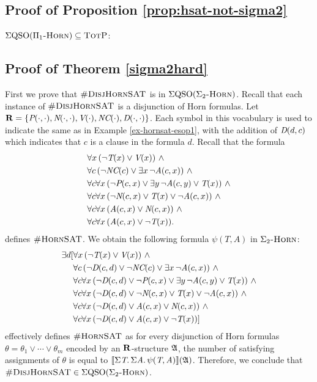 \subsection*{Proof of Proposition \ref{prop:hsat-not-sigma2}} %
$\Sigma{\rm QSO}(\Pi_1\textsc{-Horn}) \subseteq \text{\sc TotP}$:\vspace{1em}

\subsection*{Proof of Theorem \ref{sigma2hard}} %

First we prove that $\textsc{\#DisjHornSAT}$ is in $\Sigma{\rm QSO}(\Sigma_2\textsc{-Horn})$. Recall that each instance of $\textsc{\#DisjHornSAT}$ is a disjunction of Horn formulas. Let $\mathbf{R} = \{\textit{P}(\cdot,\cdot), \textit{N}(\cdot,\cdot), \textit{V}(\cdot), \textit{NC}(\cdot), \textit{D}(\cdot,\cdot)\}$. Each symbol in this vocabulary is used to indicate the same as in Example \ref{ex-hornsat-esop1}, with the addition of $\textit{D}(d,c)$ which indicates that $c$ is a clause in the formula $d$. Recall that the formula
\begin{align*}
&\forall x \, (\neg \pT(x) \vee \pV(x)) \ \wedge\\
&\forall c \, (\neg \textit{NC}(c) \vee \exists x \, \neg \textit{A}(c,x)) \ \wedge\\
&\forall c \forall x \, (\neg \textit{P}(c,x) \vee \exists y \, \neg \textit{A}(c,y) \vee \textit{T}(x)) \ \wedge\\
&\forall c \forall x \, (\neg \textit{N}(c,x) \vee \textit{T}(x) \vee \neg \textit{A}(c,x)) \ \wedge\\
&\forall c \forall x \, (\textit{A}(c,x) \vee \textit{N}(c,x)) \ \wedge\\
&\forall c \forall x \, (\textit{A}(c,x) \vee \neg\textit{T}(x)).
\end{align*}
defines $\textsc{\#HornSAT}$. We obtain the following formula $\psi(T,A)$ in $\Sigma_2\textsc{-Horn}$:
\begin{align*}
\exists d[&\forall x \, (\neg \textit{T}(x) \vee \textit{V}(x)) \ \wedge\\
&\forall c \, (\neg \textit{D}(c,d)\vee \neg \textit{NC}(c) \vee \exists x \, \neg \textit{A}(c,x)) \ \wedge\\
&\forall c \forall x \, (\neg \textit{D}(c,d)\vee\neg \textit{P}(c,x) \vee \exists y \, \neg \textit{A}(c,y) \vee \textit{T}(x)) \ \wedge\\
&\forall c \forall x \, (\neg \textit{D}(c,d)\vee\neg \textit{N}(c,x) \vee \textit{T}(x) \vee \neg \textit{A}(c,x)) \ \wedge\\
&\forall c \forall x \, (\neg \textit{D}(c,d)\vee\textit{A}(c,x) \vee \textit{N}(c,x)) \ \wedge\\
&\forall c \forall x \, (\neg \textit{D}(c,d)\vee\textit{A}(c,x) \vee \neg\textit{T}(x))]
\end{align*}
effectively defines $\textsc{\#HornSAT}$ as for every disjunction of Horn formulas $\theta = \theta_1\vee\cdots\vee\theta_m$ encoded by an $\mathbf{R}$-structure $\mathfrak{A}$, the number of satisfying assignments of $\theta$ is equal to ${\llbracket{}{\Sigma{\textit{T}}.\, \Sigma{\textit{A}}.\, \psi(\textit{T},\textit{A})}\rrbracket}(\mathfrak{A})$.  Therefore, we conclude that $\textsc{\#DisjHornSAT} \in \Sigma{\rm QSO}(\Sigma_2\textsc{-Horn})$.

